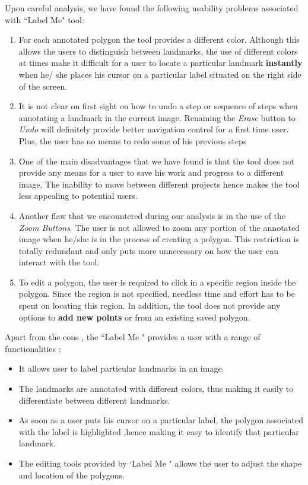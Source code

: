 \documentclass[11pt]{amsart}
\begin{document}
Upon careful analysis, we have found the following usability problems associated with ``Label Me" tool:
\begin{enumerate}
\item  For each annotated polygon the tool provides a different color. Although this allows  the users to distinguish between landmarks, the use of different colors at times make it difficult  for a user to locate a particular landmark \textbf{instantly} when he/ she places his cursor on a particular label situated on the right side of the screen.
\item It is not clear on first sight on how to undo a step or sequence of steps  when annotating a   landmark in the current image.  Renaming the \emph{ Erase} button to \emph{Undo} will definitely provide better navigation control for a first time  user. Plus, the user has no means to redo some of his previous steps
\item One of the main disadvantages that we have found is that the tool does not provide any means for a user to save his work and  progress to a different image. The inability to move between different projects hence makes the tool less appealing to potential users.
\item Another flaw that we encountered  during our analysis is in the use of the \emph{Zoom Buttons}. The user is not allowed to zoom any portion of the annotated image when he/she is in the process of creating a polygon. This restriction is totally redundant and only puts more unnecessary on how the user can interact with the tool.
\item To edit a polygon, the user is required to click in a specific region inside the polygon. Since the region is not specified, needless time and effort has to be spent on locating this region. In addition, the tool does not provide any options to \textbf{ add new points} or  from an existing saved polygon.
\end{enumerate}


Apart from the cons , the ``Label Me "  provides a user with a range of functionalities :
\begin {itemize}
\item  It allows user to label particular landmarks in an image.
\item  The landmarks are annotated with different colors, thus making it easily to differentiate between different landmarks.
\item  As soon as a user puts  his cursor on a particular label, the polygon associated with the label is highlighted ,hence making it easy to identify that particular landmark.
\item The editing tools provided by `Label Me " allows  the user to adjust the shape and location of the polygons.
\end{itemize}
\end{document}
